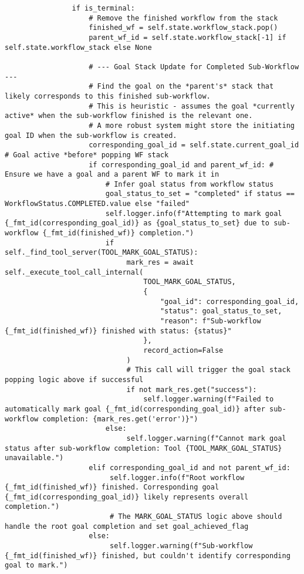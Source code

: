 \documentclass[12pt,a4paper]{article}
\begin{document}
\begin{pageablecode}
\begin{verbatim}
                if is_terminal:
                    # Remove the finished workflow from the stack
                    finished_wf = self.state.workflow_stack.pop()
                    parent_wf_id = self.state.workflow_stack[-1] if self.state.workflow_stack else None

                    # --- Goal Stack Update for Completed Sub-Workflow ---
                    # Find the goal on the *parent's* stack that likely corresponds to this finished sub-workflow.
                    # This is heuristic - assumes the goal *currently active* when the sub-workflow finished is the relevant one.
                    # A more robust system might store the initiating goal ID when the sub-workflow is created.
                    corresponding_goal_id = self.state.current_goal_id # Goal active *before* popping WF stack
                    if corresponding_goal_id and parent_wf_id: # Ensure we have a goal and a parent WF to mark it in
                        # Infer goal status from workflow status
                        goal_status_to_set = "completed" if status == WorkflowStatus.COMPLETED.value else "failed"
                        self.logger.info(f"Attempting to mark goal {_fmt_id(corresponding_goal_id)} as {goal_status_to_set} due to sub-workflow {_fmt_id(finished_wf)} completion.")
                        if self._find_tool_server(TOOL_MARK_GOAL_STATUS):
                             mark_res = await self._execute_tool_call_internal(
                                 TOOL_MARK_GOAL_STATUS,
                                 {
                                     "goal_id": corresponding_goal_id,
                                     "status": goal_status_to_set,
                                     "reason": f"Sub-workflow {_fmt_id(finished_wf)} finished with status: {status}"
                                 },
                                 record_action=False
                             )
                             # This call will trigger the goal stack popping logic above if successful
                             if not mark_res.get("success"):
                                 self.logger.warning(f"Failed to automatically mark goal {_fmt_id(corresponding_goal_id)} after sub-workflow completion: {mark_res.get('error')}")
                        else:
                             self.logger.warning(f"Cannot mark goal status after sub-workflow completion: Tool {TOOL_MARK_GOAL_STATUS} unavailable.")
                    elif corresponding_goal_id and not parent_wf_id:
                         self.logger.info(f"Root workflow {_fmt_id(finished_wf)} finished. Corresponding goal {_fmt_id(corresponding_goal_id)} likely represents overall completion.")
                         # The MARK_GOAL_STATUS logic above should handle the root goal completion and set goal_achieved_flag
                    else:
                         self.logger.warning(f"Sub-workflow {_fmt_id(finished_wf)} finished, but couldn't identify corresponding goal to mark.")



\end{verbatim}
\end{pageablecode}
\end{document}

